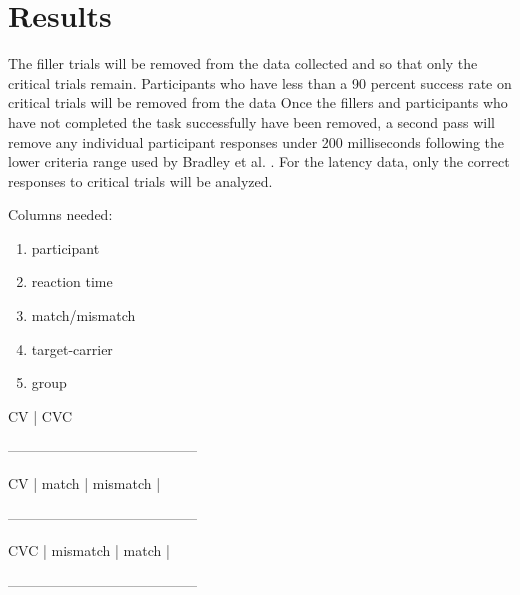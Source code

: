 
\section{Results}

The filler trials will be removed from the data collected and so that only the critical trials remain. Participants who have less than a 90 percent success rate on critical trials will be removed from the data %
Once the fillers and participants who have not completed the task successfully have been removed, a second pass will remove any individual participant responses under 200 milliseconds following the lower criteria range used by Bradley et al. \parencite*{Bradley1993-qq}. %
For the latency data, only the correct responses to critical trials will be analyzed.

Columns needed:
\begin{enumerate}
\item{participant}
\item{reaction time}
\item{match/mismatch}
\item{target-carrier}
\item{group}
\end{enumerate}


		CV	   |	CVC	
			
-----------------------------------------

CV	|     match	   |  mismatch |

-----------------------------------------

CVC |  mismatch |     match    |

-----------------------------------------





